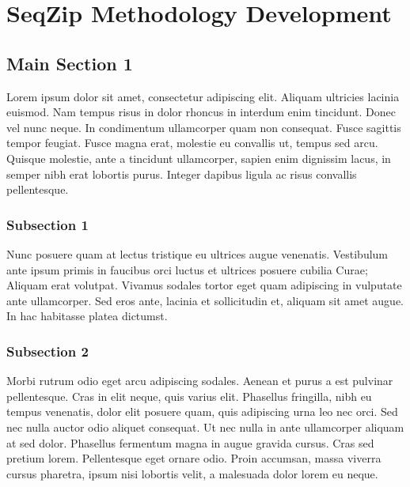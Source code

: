 
\chapter{SeqZip Methodology Development} %

\label{Chapter2} %



\section{Main Section 1}

Lorem ipsum dolor sit amet, consectetur adipiscing elit. Aliquam ultricies lacinia euismod. Nam tempus risus in dolor rhoncus in interdum enim tincidunt. Donec vel nunc neque. In condimentum ullamcorper quam non consequat. Fusce sagittis tempor feugiat. Fusce magna erat, molestie eu convallis ut, tempus sed arcu. Quisque molestie, ante a tincidunt ullamcorper, sapien enim dignissim lacus, in semper nibh erat lobortis purus. Integer dapibus ligula ac risus convallis pellentesque.

\subsection{Subsection 1}

Nunc posuere quam at lectus tristique eu ultrices augue venenatis. Vestibulum ante ipsum primis in faucibus orci luctus et ultrices posuere cubilia Curae; Aliquam erat volutpat. Vivamus sodales tortor eget quam adipiscing in vulputate ante ullamcorper. Sed eros ante, lacinia et sollicitudin et, aliquam sit amet augue. In hac habitasse platea dictumst.


\subsection{Subsection 2}
Morbi rutrum odio eget arcu adipiscing sodales. Aenean et purus a est pulvinar pellentesque. Cras in elit neque, quis varius elit. Phasellus fringilla, nibh eu tempus venenatis, dolor elit posuere quam, quis adipiscing urna leo nec orci. Sed nec nulla auctor odio aliquet consequat. Ut nec nulla in ante ullamcorper aliquam at sed dolor. Phasellus fermentum magna in augue gravida cursus. Cras sed pretium lorem. Pellentesque eget ornare odio. Proin accumsan, massa viverra cursus pharetra, ipsum nisi lobortis velit, a malesuada dolor lorem eu neque.


